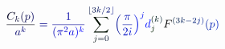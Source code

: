 \documentclass[12pt]{article}
\begin{document}
\makeatletter
\renewcommand*{\@textcolor}[3]{%
  \protect\leavevmode
  \begingroup
    \color#1{#2}#3%
  \endgroup
}
\makeatother
\begin{displaymath}
\mathcolor[RGB]{0,0,15}{\frac { \mathcolor[RGB]{0,0,30}{C} _ { \mathcolor[RGB]{0,0,45}{k} } \mathcolor[RGB]{0,0,60}{(} \mathcolor[RGB]{0,0,75}{p} \mathcolor[RGB]{0,0,90}{)} } { \mathcolor[RGB]{0,0,105}{a} ^ { \mathcolor[RGB]{0,0,120}{k} } } } \mathcolor[RGB]{0,0,135}{=} \mathcolor[RGB]{0,0,150}{\frac { \mathcolor[RGB]{0,0,165}{1} } { \mathcolor[RGB]{0,0,180}{(} \mathcolor[RGB]{0,0,195}{\pi} ^ { \mathcolor[RGB]{0,0,210}{2} } \mathcolor[RGB]{0,0,225}{a} \mathcolor[RGB]{0,0,240}{)} ^ { \mathcolor[RGB]{0,0,255}{k} } } } \mathcolor[RGB]{0,15,0}{\sum} _ { \mathcolor[RGB]{0,15,15}{j} \mathcolor[RGB]{0,15,30}{=} \mathcolor[RGB]{0,15,45}{0} } ^ { \mathcolor[RGB]{0,15,60}{\lfloor} \mathcolor[RGB]{0,15,75}{3} \mathcolor[RGB]{0,15,90}{k} \mathcolor[RGB]{0,15,105}{/} \mathcolor[RGB]{0,15,120}{2} \mathcolor[RGB]{0,15,135}{\rfloor} } \mathcolor[RGB]{0,15,150}{\Bigl(} \mathcolor[RGB]{0,15,165}{\frac { \mathcolor[RGB]{0,15,180}{\pi} } { \mathcolor[RGB]{0,15,195}{2} \mathcolor[RGB]{0,15,210}{i} } } \mathcolor[RGB]{0,15,225}{\Bigr)} ^ { \mathcolor[RGB]{0,15,240}{j} } \mathcolor[RGB]{0,15,255}{d} _ { \mathcolor[RGB]{0,30,0}{j} } ^ { \mathcolor[RGB]{0,30,15}{(} \mathcolor[RGB]{0,30,30}{k} \mathcolor[RGB]{0,30,45}{)} }
F ^ { \mathcolor[RGB]{0,30,60}{(} \mathcolor[RGB]{0,30,75}{3} \mathcolor[RGB]{0,30,90}{k} \mathcolor[RGB]{0,30,105}{-} \mathcolor[RGB]{0,30,120}{2} \mathcolor[RGB]{0,30,135}{j} \mathcolor[RGB]{0,30,150}{)} } \mathcolor[RGB]{0,30,165}{(} \mathcolor[RGB]{0,30,180}{p} \mathcolor[RGB]{0,30,195}{)}
\end{displaymath}
\end{document}
